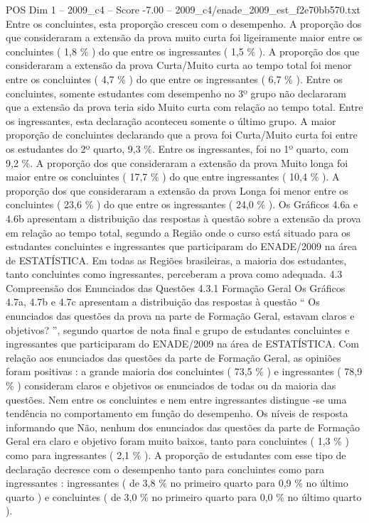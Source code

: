 \begin{textsample}{POS Dim 1 – 2009\_c4 – Score -7.00 – 2009\_c4/enade\_2009\_est\_f2e70bb570.txt}
Entre os concluintes, esta proporção cresceu com o desempenho.
A proporção dos que consideraram a extensão da prova muito curta foi ligeiramente maior entre os concluintes ( 1,8 \% ) do que entre os ingressantes ( 1,5 \% ).
A proporção dos que consideraram a extensão da prova Curta/Muito curta ao tempo total foi menor entre os concluintes ( 4,7 \% ) do que entre os ingressantes ( 6,7 \% ).
Entre os concluintes, somente estudantes com desempenho no 3º grupo não declararam que a extensão da prova teria sido Muito curta com relação ao tempo total.
Entre os ingressantes, esta declaração aconteceu somente o último grupo.
A maior proporção de concluintes declarando que a prova foi Curta/Muito curta foi entre os estudantes do 2º quarto, 9,3 \%.
Entre os ingressantes, foi no 1º quarto, com 9,2 \%.
A proporção dos que consideraram a extensão da prova Muito longa foi maior entre os concluintes ( 17,7 \% ) do que entre ingressantes ( 10,4 \% ).
A proporção dos que consideraram a extensão da prova Longa foi menor entre os concluintes ( 23,6 \% ) do que entre os ingressantes ( 24,0 \% ).
Os Gráficos 4.6a e 4.6b apresentam a distribuição das respostas à questão sobre a extensão da prova em relação ao tempo total, segundo a Região onde o curso está situado para os estudantes concluintes e ingressantes que participaram do ENADE/2009 na área de ESTATÍSTICA.
Em todas as Regiões brasileiras, a maioria dos estudantes, tanto concluintes como ingressantes, perceberam a prova como adequada. 4.3 Compreensão dos Enunciados das Questões 4.3.1 Formação Geral Os Gráficos 4.7a, 4.7b e 4.7c apresentam a distribuição das respostas à questão “ Os enunciados das questões da prova na parte de Formação Geral, estavam claros e objetivos? ”, segundo quartos de nota final e grupo de estudantes concluintes e ingressantes que participaram do ENADE/2009 na área de ESTATÍSTICA.
Com relação aos enunciados das questões da parte de Formação Geral, as opiniões foram positivas : a grande maioria dos concluintes ( 73,5 \% ) e ingressantes ( 78,9 \% ) consideram claros e objetivos os enunciados de todas ou da maioria das questões.
Nem entre os concluintes e nem entre ingressantes distingue -se uma tendência no comportamento em função do desempenho.
Os níveis de resposta informando que Não, nenhum dos enunciados das questões da parte de Formação Geral era claro e objetivo foram muito baixos, tanto para concluintes ( 1,3 \% ) como para ingressantes ( 2,1 \% ).
A proporção de estudantes com esse tipo de declaração decresce com o desempenho tanto para concluintes como para ingressantes : ingressantes ( de 3,8 \% no primeiro quarto para 0,9 \% no último quarto ) e concluintes ( de 3,0 \% no primeiro quarto para 0,0 \% no último quarto ).

\end{textsample}
